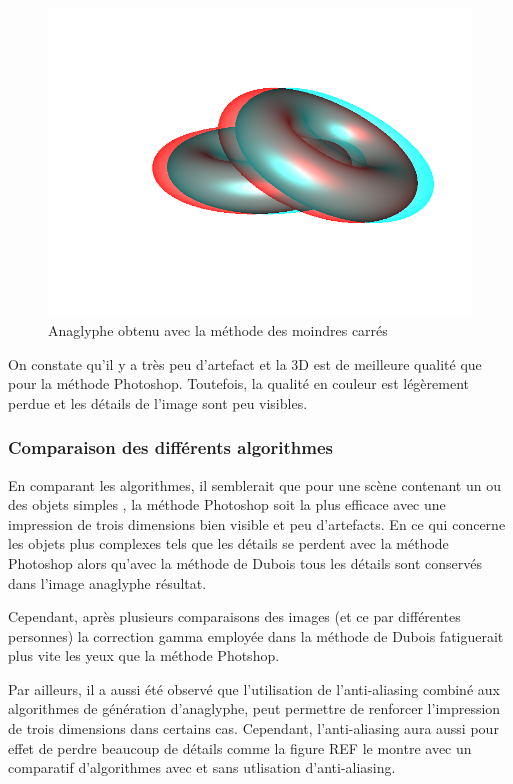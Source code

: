 \begin{figure}[h]
	\centering
	\includegraphics[scale=0.3]{moindreCarres.png}
	\caption{\label{fig:moindresCarres} Anaglyphe obtenu avec la méthode des moindres carrés \protect}
\end{figure}
	
	On constate qu'il y a très peu d'artefact et la 3D est de meilleure qualité que pour la méthode Photoshop. Toutefois, la qualité en couleur est légèrement perdue et les détails de l'image sont peu visibles. 
	

\subsubsection{Comparaison des différents algorithmes}

En comparant les algorithmes, il semblerait que pour une scène contenant un ou des objets simples %
, la méthode Photoshop soit la plus efficace avec une impression de trois dimensions bien visible et peu d'artefacts. En ce qui concerne les objets plus complexes tels que %
les détails se perdent avec la méthode Photoshop alors qu'avec la méthode de Dubois tous les détails sont conservés dans l'image anaglyphe résultat. 

Cependant, après plusieurs comparaisons des images (et ce par différentes personnes) la correction gamma employée dans la méthode de Dubois fatiguerait plus vite les yeux que la méthode Photshop.

Par ailleurs, il a aussi été observé que l'utilisation de l'anti-aliasing combiné aux algorithmes de génération d'anaglyphe, peut permettre de renforcer l'impression de trois dimensions dans certains cas. Cependant, l'anti-aliasing aura aussi pour effet de perdre beaucoup de détails comme la figure REF le montre avec un comparatif d'algorithmes avec et sans utlisation d'anti-aliasing. 

